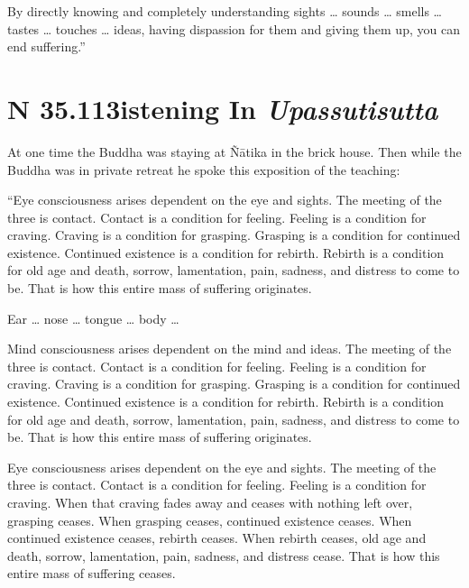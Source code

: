 \documentclass[12pt,openany]{book}%
\newcommand*{\suttatitleacronym}[1]{\smaller[2]{#1}\vspace*{.3em}}
\newcommand*{\suttatitletranslation}[1]{\linebreak{#1}}
\newcommand*{\suttatitleroot}[1]{\linebreak\smaller[2]\itshape{#1}}
\newcommand*{\tocacronym}[1]{\hspace*{-3.3em}{#1}\quad}
\newcommand*{\toctranslation}[1]{#1}
\newcommand*{\tocroot}[1]{(\textit{#1})}
\begin{document}
By directly knowing and completely understanding sights … sounds … smells … tastes … touches … ideas, having dispassion for them and giving them up, you can end suffering.” 

%
\section*{{\suttatitleacronym SN 35.113}{\suttatitletranslation Listening In }{\suttatitleroot Upassutisutta}}
\addcontentsline{toc}{section}{\tocacronym{SN 35.113} \toctranslation{Listening In } \tocroot{Upassutisutta}}

At one time the Buddha was staying at \textsanskrit{Ñātika} in the brick house. Then while the Buddha was in private retreat he spoke this exposition of the teaching: 

“Eye consciousness arises dependent on the eye and sights. The meeting of the three is contact. Contact is a condition for feeling. Feeling is a condition for craving. Craving is a condition for grasping. Grasping is a condition for continued existence. Continued existence is a condition for rebirth. Rebirth is a condition for old age and death, sorrow, lamentation, pain, sadness, and distress to come to be. That is how this entire mass of suffering originates. 

Ear … nose … tongue … body … 

Mind consciousness arises dependent on the mind and ideas. The meeting of the three is contact. Contact is a condition for feeling. Feeling is a condition for craving. Craving is a condition for grasping. Grasping is a condition for continued existence. Continued existence is a condition for rebirth. Rebirth is a condition for old age and death, sorrow, lamentation, pain, sadness, and distress to come to be. That is how this entire mass of suffering originates. 

Eye consciousness arises dependent on the eye and sights. The meeting of the three is contact. Contact is a condition for feeling. Feeling is a condition for craving. When that craving fades away and ceases with nothing left over, grasping ceases. When grasping ceases, continued existence ceases. When continued existence ceases, rebirth ceases. When rebirth ceases, old age and death, sorrow, lamentation, pain, sadness, and distress cease. That is how this entire mass of suffering ceases. 
\end{document}
